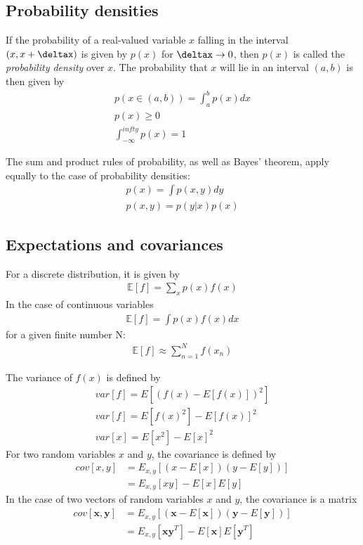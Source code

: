 \documentclass[a4paper]{article}
\begin{document}
\subsection{Probability densities}
If the probability of a real-valued variable $x$ falling in the
interval $(x, x+\deltax)$ is given by $p(x)$ for $\deltax \to 0$, then
$p(x)$ is called the \textit{probability density} over $x$. The probability that $x$ will lie in an interval $(a, b)$ is then given by
\begin{align}
p(x \in (a,b)) = \int_a^b p(x) dx\\
p(x) \geq 0\\
\int_{-\infty}^{infty} p(x) = 1
\end{align}

The sum and product rules of probability, as well as Bayes' theorem,
apply equally to the case of probability densities:
\begin{align}
p(x) = \int p(x,y)dy\\
p(x,y) = p(y|x) p(x)
\end{align}

\subsection{Expectations and covariances}
For a discrete distribution, it is given by
\begin{align}
\mathbb{E}[f] = \sum_x p(x)f(x)
\end{align}
In the case of continuous variables
\begin{align}
\mathbb{E}[f] = \int p(x)f(x) dx
\end{align}
for a given finite number N:
\begin{align}
\mathbb{E}[f] \approx \sum_{n=1}^N f(x_n)
\end{align}


The variance of $f(x)$ is defined by
\begin{align}
var[f] = E[ (f(x) -E[f(x)])^2 ]\\
var[f] = E[f(x)^2] -E[f(x)]^2\\
var[x] = E[x^2] -E[x]^2
\end{align}
For two random variables $x$ and $y$, the covariance is defined by
\begin{align*}
cov[x,y] &= E_{x,y}[ (x-E[x])(y-E[y]) ]\\
&= E_{x,y}[xy] - E[x]E[y]
\end{align*}
In the case of two vectors of random variables $x$ and $y$, the covariance is a matrix
\begin{align*}
cov[\mathbf{x},\mathbf{y}] &= E_{x,y} [ (\mathbf{x}-E[\mathbf{x}])(\mathbf{y}-E[\mathbf{y}]) ]\\
&= E_{x,y}[\mathbf{x}\mathbf{y}^T] - E[\mathbf{x}]E[\mathbf{y}^T]
\end{align*}
\end{document}
